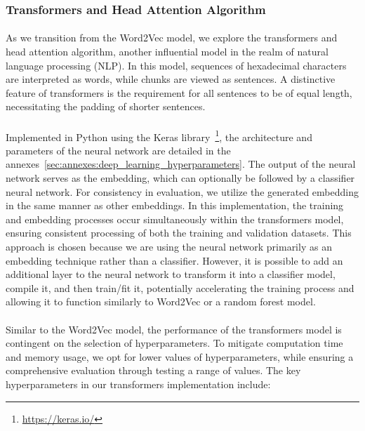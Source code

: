     \subsubsection{Transformers and Head Attention Algorithm}
        \paragraph{}As we transition from the Word2Vec model, we explore the transformers and head attention algorithm, another influential model in the realm of natural language processing (NLP). In this model, sequences of hexadecimal characters are interpreted as words, while chunks are viewed as sentences. A distinctive feature of transformers is the requirement for all sentences to be of equal length, necessitating the padding of shorter sentences.
        
        \paragraph{}Implemented in Python using the Keras library~\footnote{\url{https://keras.io/}}, the architecture and parameters of the neural network are detailed in the annexes~\ref{sec:annexes:deep_learning_hyperparameters}. The output of the neural network serves as the embedding, which can optionally be followed by a classifier neural network. For consistency in evaluation, we utilize the generated embedding in the same manner as other embeddings. In this implementation, the training and embedding processes occur simultaneously within the transformers model, ensuring consistent processing of both the training and validation datasets. This approach is chosen because we are using the neural network primarily as an embedding technique rather than a classifier. However, it is possible to add an additional layer to the neural network to transform it into a classifier model, compile it, and then train/fit it, potentially accelerating the training process and allowing it to function similarly to Word2Vec or a random forest model.

        \paragraph{}Similar to the Word2Vec model, the performance of the transformers model is contingent on the selection of hyperparameters. To mitigate computation time and memory usage, we opt for lower values of hyperparameters, while ensuring a comprehensive evaluation through testing a range of values. The key hyperparameters in our transformers implementation include:
        
